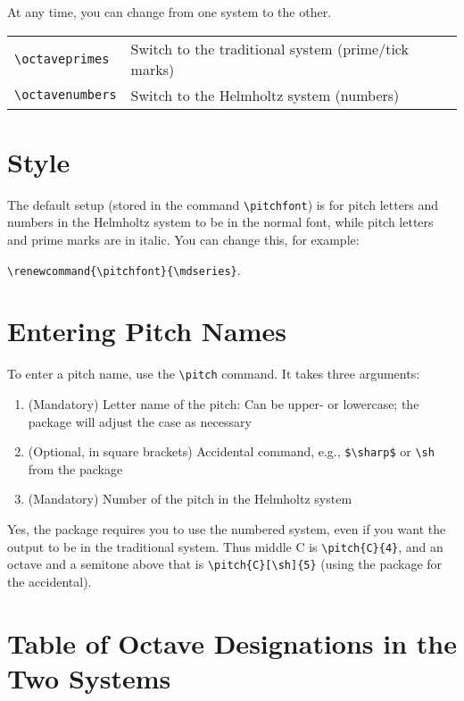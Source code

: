 \documentclass{article}
\begin{document}
At any time, you can change from one system to the other.

\begin{center}
\begin{tabular}{ll}
    \verb|\octaveprimes|    
        & Switch to the traditional system (prime/tick marks) \\
    \verb|\octavenumbers|   
        & Switch to the Helmholtz system (numbers) \\
\end{tabular}
\end{center}

\section{Style}

The default setup (stored in the command \verb|\pitchfont|) is for pitch letters
and numbers in the Helmholtz system to be in the normal font, while pitch
letters and prime marks are in italic.  You can change this, for example:

\verb|\renewcommand{\pitchfont}{\mdseries}|.

\section{Entering Pitch Names}

To enter a pitch name, use the \verb|\pitch| command.
It takes three arguments:
\begin{enumerate}
    \item (Mandatory) Letter name of the pitch: Can be upper- or lowercase; the
        package will adjust the case as necessary
    \item (Optional, in square brackets) Accidental command, e.g., \verb|$\sharp$| or \verb|\sh|
        from the  package
    \item (Mandatory) Number of the pitch in the Helmholtz system
\end{enumerate}

Yes, the package requires you to use the numbered system, even if you want the
output to be in the traditional system. 
Thus middle C is \verb|\pitch{C}{4}|, and an octave and a semitone above that is
\verb|\pitch{C}[\sh]{5}| (using the  package for the
accidental).


\section{Table of Octave Designations in the Two Systems}
\end{document}
